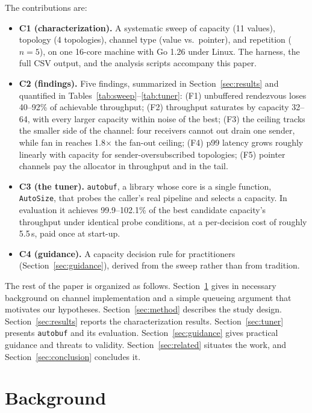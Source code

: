 \documentclass[10pt,a4paper]{article}
\begin{document}
The contributions are:
\begin{itemize}
  \item \textbf{C1 (characterization).} A systematic sweep of capacity
        (11 values), topology (4 topologies), channel type (value vs.\ pointer),
        and repetition ($n=5$), on one 16-core machine with Go 1.26 under
        Linux. The harness, the full CSV output, and the analysis scripts
        accompany this paper.
  \item \textbf{C2 (findings).} Five findings, summarized in
        Section~\ref{sec:results} and quantified in
        Tables~\ref{tab:sweep}--\ref{tab:tuner}: (F1) unbuffered rendezvous
        loses 40--92\% of achievable throughput; (F2) throughput saturates by
        capacity 32--64, with every larger capacity within noise of the best;
        (F3) the ceiling tracks the smaller side of the channel: four receivers
        cannot out drain one sender, while fan in reaches 1.8$\times$ the
        fan-out ceiling; (F4) p99 latency grows roughly linearly with capacity
        for sender-oversubscribed topologies; (F5) pointer channels pay the
        allocator in throughput and in the tail.
  \item \textbf{C3 (the tuner).} \texttt{autobuf}, a library whose core is a
        single function, \texttt{AutoSize}, that probes the caller's real
        pipeline and selects a capacity. In evaluation it achieves
        99.9--102.1\% of the best candidate capacity's throughput under
        identical probe conditions, at a per-decision cost of roughly 5.5\,s,
        paid once at start-up.
  \item \textbf{C4 (guidance).} A capacity decision rule for practitioners
        (Section~\ref{sec:guidance}), derived from the sweep rather than from
        tradition.
\end{itemize}

The rest of the paper is organized as follows.
Section~\ref{sec:background} gives in necessary background on channel
implementation and a simple queueing argument that motivates our hypotheses.
Section~\ref{sec:method} describes the study design.
Section~\ref{sec:results} reports the characterization results.
Section~\ref{sec:tuner} presents \texttt{autobuf} and its evaluation.
Section~\ref{sec:guidance} gives practical guidance and threats to validity.
Section~\ref{sec:related} situates the work, and
Section~\ref{sec:conclusion} concludes it.

\section{Background}
\label{sec:background}
\end{document}
